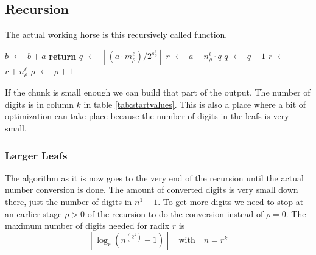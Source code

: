\documentclass[a4paper,10pt]{article}
\newcommand*\Let[2]{\State #1 $\gets$ #2}
\newcommand{\RETURN}{\State \textbf{return} }
\providecommand{\floor}[1]{\left\lfloor#1\right\rfloor}
\providecommand{\ceil}[1]{\left\lceil#1\right\rceil}
\DeclareMathOperator{\AND}{\wedge}
\theoremstyle{plain} %
\theoremstyle{definition}
\theoremstyle{remark}
\begin{document}
\subsection{Recursion}
The actual working horse is this recursively called function.
\begin{center}
\begin{minipage}{.9\linewidth}
  \begin{algorithmic}[1]
      \Let{$b$}{$b + a$}
      \RETURN
    \Else
      \Let{$q$}{$\floor{\left(a\cdot m^\ell_\rho\right) / 2^{s^\ell_\rho}}$}
      \Let{$r$}{$ a - n^\ell_\rho \cdot q$}
        \Let{$q$}{$q - 1$}
        \Let{$r$}{$r + n^\ell_\rho$}
      \EndIf
      \Let{$\rho$}{$\rho + 1$}
      \If{$\left(L = 1\right) \AND \left(q = 0\right) $}
        \State {}
      \Else
        \State {}
        \State {}
      \EndIf
    \EndIf
    \EndFunction
  \end{algorithmic}
 \end{minipage}
\end{center}


If the chunk is small enough we can build that part of the output. The number of digits is in column $k$ in table \ref{tab:startvalues}. This is also a place where a bit of optimization can take place because the number of digits in the leafs is very small.

\subsubsection{Larger Leafs}
The algorithm as it is now goes to the very end of the recursion until the actual number conversion is done. The 
amount of converted digits is very small down there, just the number of digits in $n^1-1$.
To get more digits we need to stop at an earlier stage $\rho > 0$ of the recursion to do the conversion instead of $
\rho = 0$. The maximum number of digits needed for radix $r$ is
\begin{equation}
\ceil{\log_r\left(n^{\left(2^k\right)}-1\right)}\quad\text{with}\quad n = r^k
\end{equation}
\end{document}
